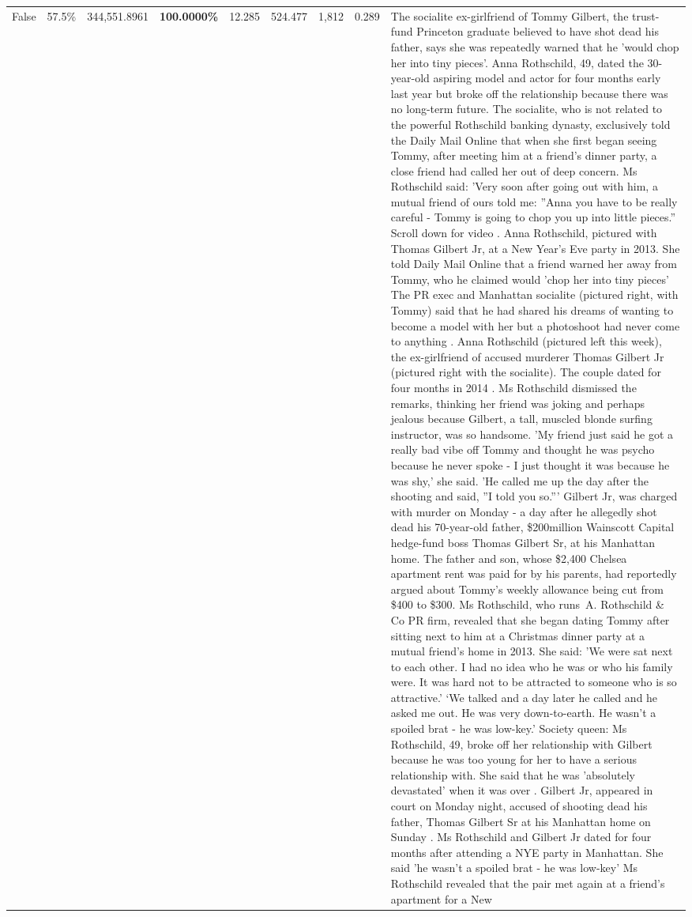 \begin{table}[H]
\begin{tabular}{lllrlllll}
False & 57.5\% & 344,551.8961 & \bfseries \color{red} 100.0000\% & 12.285 & 524.477 & 1,812 & 0.289 & The socialite ex-girlfriend of Tommy Gilbert, the trust-fund Princeton graduate believed to have shot dead his father, says she was repeatedly warned that he 'would chop her into tiny pieces'. Anna Rothschild, 49, dated the 30-year-old aspiring model and actor for four months early last year but broke off the relationship because there was no long-term future. The socialite, who is not related to the powerful Rothschild banking dynasty, exclusively told the Daily Mail Online that when she first began seeing Tommy, after meeting him at a friend's dinner party, a close friend had called her out of deep concern. Ms Rothschild said: 'Very soon after going out with him, a mutual friend of ours told me: ''Anna you have to be really careful - Tommy is going to chop you up into little pieces.'' Scroll down for video . Anna Rothschild, pictured with Thomas Gilbert Jr, at a New Year's Eve party in 2013. She told Daily Mail Online that a friend warned her away from Tommy, who he claimed would 'chop her into tiny pieces' The PR exec and Manhattan socialite (pictured right, with Tommy) said that he had shared his dreams of wanting to become a model with her but a photoshoot had never come to anything . Anna Rothschild (pictured left this week), the ex-girlfriend of accused murderer Thomas Gilbert Jr (pictured right with the socialite). The couple dated for four months in 2014 . Ms Rothschild dismissed the remarks, thinking her friend was joking and perhaps jealous because Gilbert, a tall, muscled blonde surfing instructor, was so handsome. 'My friend just said he got a really bad vibe off Tommy and thought he was psycho because he never spoke - I just thought it was because he was shy,' she said. 'He called me up the day after the shooting and said, ''I told you so.''' Gilbert Jr, was charged with murder on Monday - a day after he allegedly shot dead his 70-year-old father, \$200million Wainscott Capital hedge-fund boss Thomas Gilbert Sr, at his Manhattan home. The father and son, whose \$2,400 Chelsea apartment rent was paid for by his parents, had reportedly argued about Tommy's weekly allowance being cut from \$400 to \$300. Ms Rothschild, who runs A. Rothschild \& Co PR firm, revealed that she began dating Tommy after sitting next to him at a Christmas dinner party at a mutual friend's home in 2013. She said: 'We were sat next to each other. I had no idea who he was or who his family were. It was hard not to be attracted to someone who is so attractive.' ‘We talked and a day later he called and he asked me out. He was very down-to-earth. He wasn’t a spoiled brat - he was low-key.’ Society queen: Ms Rothschild, 49, broke off her relationship with Gilbert because he was too young for her to have a serious relationship with. She said that he was 'absolutely devastated' when it was over . Gilbert Jr, appeared in court on Monday night, accused of shooting dead his father, Thomas Gilbert Sr at his Manhattan home on Sunday . Ms Rothschild and Gilbert Jr dated for four months after attending a NYE party in Manhattan. She said 'he wasn't a spoiled brat - he was low-key' Ms Rothschild revealed that the pair met again at a friend’s apartment for a New 
\end{tabular}
\end{table}
